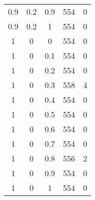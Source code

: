 \begin{table}[!h]
\begin{center}
\begin{tabular}{|c|c|c|c|c|}
			0.9  & 0.2  & 0.9  & 554  & 0   \\
			0.9  & 0.2  & 1    & 554  & 0     \\ \hline
			1    & 0    & 0    & 554  & 0  \\
			1    & 0    & 0.1  & 554  & 0  \\
			1    & 0    & 0.2  & 554  & 0     \\
			1    & 0    & 0.3  & 558  & 4   \\
			1    & 0    & 0.4  & 554  & 0   \\
			1    & 0    & 0.5  & 554  & 0     \\
			1    & 0    & 0.6  & 554  & 0   \\
			1    & 0    & 0.7  & 554  & 0   \\
			1    & 0    & 0.8  & 556  & 2   \\
			1    & 0    & 0.9  & 554  & 0   \\
			1    & 0    & 1    & 554  & 0  \\
			\hline
		\end{tabular}
	\end{center}
\end{table}